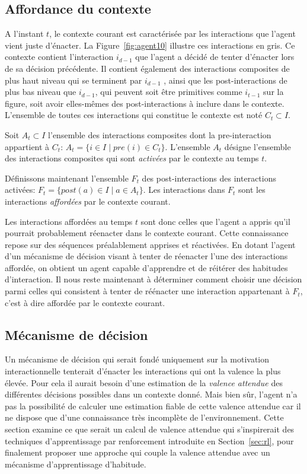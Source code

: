 \subsection{Affordance du contexte}

\noindent
A l'instant $t$, le contexte courant est caractérisée par les interactions que l'agent vient juste d'énacter.
La Figure~\ref{fig:agent10} illustre ces interactions en gris. 
Ce contexte contient l'interaction $i_{d-1}$ que l'agent a décidé de tenter d'énacter lors de sa décision précédente.
Il contient également des interactions composites de plus haut niveau qui se terminent par $i_{d-1}$ , ainsi que les post-interactions de plus bas niveau que $i_{d-1}$, qui peuvent soit être primitives comme $i_{t-1}$ sur la figure, soit avoir elles-mêmes des post-interactions à inclure dans le contexte. 
L'ensemble de toutes ces interactions qui constitue le contexte est noté  $C_t \subset I$. %

Soit $A_t \subset I$ l'ensemble des interactions composites dont la pre-interaction appartient à $C_t$: $A_t = \{i \in I \mid pre(i) \in C_t\}$.
L'ensemble $A_t$ désigne l'ensemble des interactions composites qui sont \emph{activées} par le contexte au temps $t$. 

Définissons maintenant l'ensemble $F_t$ des post-interactions des interactions activées: $F_t = \{post(a) \in I \mid a \in A_t\}$.
Les interactions dans $F_t$ sont les interactions \emph{affordées} par le contexte courant. 

Les interactions affordées au temps $t$ sont donc celles que l'agent a appris qu'il pourrait probablement réenacter dans le contexte courant. 
Cette connaissance repose sur des séquences préalablement apprises et réactivées. 
En dotant l'agent d'un mécanisme de décision visant à tenter de réenacter l'une des interactions affordée, on obtient un agent capable d'apprendre et de réitérer des habitudes d'interaction. 
Il nous reste maintenant à déterminer comment choisir une décision parmi celles qui consistent à tenter de réénacter une interaction appartenant à $F_t$, c'est à dire affordée par le contexte courant.

\subsection{Mécanisme de décision}

\noindent
Un mécanisme de décision qui serait fondé uniquement sur la motivation interactionnelle tenterait d'énacter les interactions qui ont la valence la plus élevée.
Pour cela il aurait besoin d'une estimation de la \emph{valence attendue} des différentes décisions possibles dans un contexte donné.
Mais bien sûr, l'agent n'a pas la possibilité de calculer une estimation fiable de cette valence attendue car il ne dispose que d'une connaissance très incomplète de l'environnement.
Cette section examine ce que serait un calcul de valence attendue qui s'inspirerait des techniques d'apprentissage par renforcement introduite en Section~\ref{sec:rl}, pour finalement proposer une approche qui couple la valence attendue avec un mécanisme d'apprentissage d'habitude.


